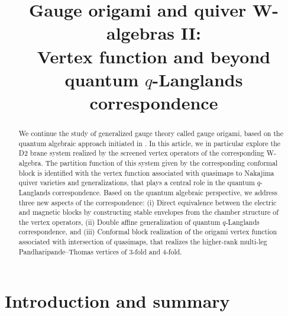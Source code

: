 
\title{Gauge origami and quiver W-algebras II:\\ Vertex function and beyond quantum $q$-Langlands correspondence}
\maketitle

\begin{abstract}
    We continue the study of generalized gauge theory called gauge origami, based on the quantum algebraic approach initiated in \cite{Kimura:2023bxy}.
    In this article, we in particular explore the D2 brane system realized by the screened vertex operators of the corresponding W-algebra. 
    The partition function of this system given by the corresponding conformal block is identified with the vertex function associated with quasimaps to Nakajima quiver varieties and generalizations, that plays a central role in the quantum $q$-Langlands correspondence.
    Based on the quantum algebraic perspective, we address three new aspects of the correspondence:
    (i) Direct equivalence between the electric and magnetic blocks by constructing stable envelopes from the chamber structure of the vertex operators, (ii) Double affine generalization of quantum $q$-Langlands correspondence, and (iii) Conformal block realization of the origami vertex function associated with intersection of quasimaps, that realizes the higher-rank multi-leg Pandharipande--Thomas vertices of 3-fold and 4-fold.
\end{abstract}

\setcounter{tocdepth}{2}
\tableofcontents

\section{Introduction and summary}

